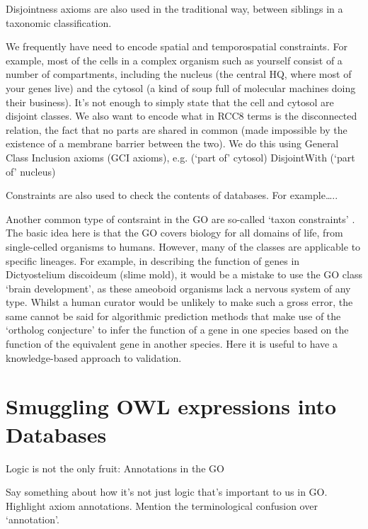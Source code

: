 \documentclass{llncs}
\begin{document}
Disjointness axioms are also used in the traditional way, between siblings in a taxonomic classification.

We frequently have need to encode spatial and temporospatial constraints. For example, most of the cells in a complex organism such as yourself consist of a number of compartments, including the nucleus (the central HQ, where most of your genes live) and the cytosol (a kind of soup full of molecular machines doing their business). It’s not enough to simply state that the cell and cytosol are disjoint classes. We also want to encode what in RCC8 terms is the disconnected relation, the fact that no parts are shared in common (made impossible by the existence of a membrane barrier between the two). We do this using General Class Inclusion axioms (GCI axioms), e.g.
     (`part of' cytosol) DisjointWith (`part of' nucleus)

Constraints are also used to check the contents of databases. For example…..

Another common type of contsraint in the GO are so-called `taxon constraints' \cite{Deegan2010}. The basic idea here is that the GO covers biology for all domains of life, from single-celled organisms to humans. However, many of the classes are applicable to specific lineages. For example, in describing the function of genes in Dictyostelium discoideum (slime mold), it would be a mistake to use the GO class ‘brain development’, as these ameoboid organisms lack a nervous system of any type. Whilst a human curator would be unlikely to make such a gross error, the same cannot be said for algorithmic prediction methods that make use of the `ortholog conjecture' to infer the function of a gene in one species based on the function of the equivalent gene in another species. Here it is useful to have a knowledge-based approach to validation.


\section{Smuggling OWL expressions into Databases}


\cite{Huntley2014}
Logic is not the only fruit: Annotations in the GO

Say something about how it’s not just logic that’s important to us in GO. Highlight axiom annotations.
Mention the terminological confusion over ‘annotation’.

\end{document}
